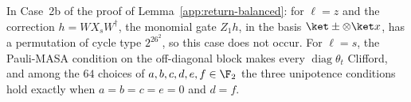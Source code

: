 In Case~2b of the proof of Lemma~\ref{app:return-balanced}: for $\ell=z$ and the correction $h=WX_sW^\dagger$, the monomial gate $Z_1h$, in the basis $\ket\pm\otimes\ket x$, has a permutation of cycle type $2^26^2$, so this case does not occur. For $\ell=s$, the Pauli-MASA condition on the off-diagonal block makes every $\operatorname{diag}\theta_t$ Clifford, and among the $64$ choices of $a,b,c,d,e,f\in\F_2$ the three unipotence conditions hold exactly when $a=b=c=e=0$ and $d=f$.
